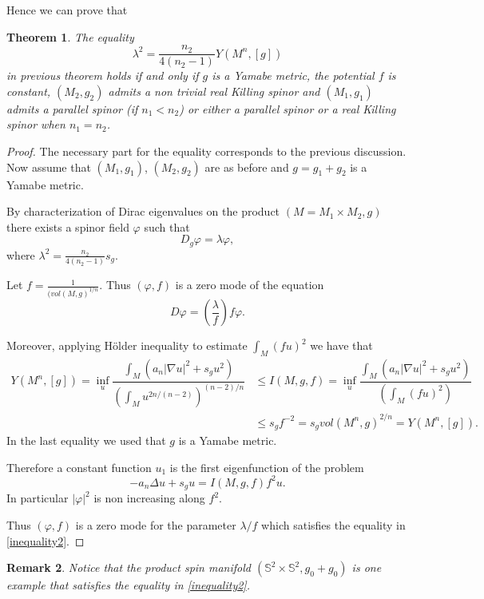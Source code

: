 \documentclass[11pt]{amsart}
\newtheorem{theorem}{Theorem}[section]
\theoremstyle{plain}
\newtheorem{remark}[theorem]{Remark}
\numberwithin{equation}{section}
\theoremstyle{plain}
\begin{document}
Hence we can prove that 
\begin{theorem}
The equality $$\lambda^2=\frac{n_2}{4(n_2-1)}Y(M^n,[g])$$ in previous theorem holds if and only if $g$ is a Yamabe metric, the potential $f$ is constant, $(M_2,g_2)$ admits a non trivial real Killing spinor and $(M_1,g_1)$ admits a parallel spinor (if $n_1<n_2$) or either a parallel spinor or a real Killing spinor when $n_1=n_2$.
\end{theorem}

\begin{proof}
The necessary part for the equality corresponds to the previous discussion. Now assume that $(M_1,g_1)$, $(M_2,g_2)$ are as before and $g=g_1+g_2$ is a Yamabe metric.

By characterization of Dirac eigenvalues on the product $(M=M_1\times M_2,g)$ there exists a spinor field $\varphi$ such that $$D_g\varphi=\lambda\varphi,$$
where $\lambda^2=\frac{n_2}{4(n_2-1)}s_g$.

Let $f=\frac{1}{(vol(M,g)^{1/n}}$. Thus $(\varphi,f)$ is a zero mode of the equation $$D\varphi=\left(\frac{\lambda}{f}\right)f\varphi.$$

Moreover, applying Hölder inequality to estimate $\int_M(fu)^2$ we have that 
\begin{align*}
Y(M^n,[g])=\inf_u \dfrac{\int_M(a_n|\nabla u|^2+s_gu^2)}{\left(\int_Mu^{2n/(n-2)}\right)^{(n-2)/n}}&\leq I(M,g,f)=\inf_u \dfrac{\int_M(a_n|\nabla u|^2+s_gu^2)}{\left(\int_M(fu)^2\right)}\\&\leq s_gf^{-2}= s_g vol(M^n,g)^{2/n}=Y(M^n,[g]). 
\end{align*}
In the last equality we used that $g$ is a Yamabe metric.

Therefore a constant function $u_1$ is the first eigenfunction of the problem $$-a_n\Delta u+s_gu=I(M,g,f)f^2u.$$
In particular $|\varphi|^2$ is non increasing along $f^2$.

Thus $(\varphi,f)$ is a zero mode for the parameter $\lambda/f$ which satisfies the equality in \eqref{inequality2}. 


\end{proof} 
 
\begin{remark}
Notice that the product spin manifold $(\mathbb{S}^2\times\mathbb{S}^2,g_0+g_0)$ is one example that satisfies the equality in \eqref{inequality2}. 
\end{remark}

 
 
\end{document}
